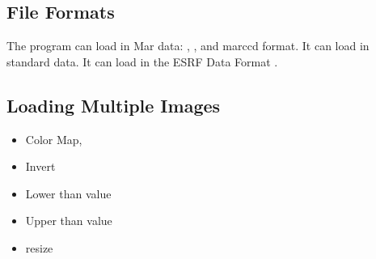 \subsection{File Formats}

The program can load in Mar data: , 
, and  marccd format.
It can load in standard  data. 
It can load in the ESRF Data Format 
.


\subsection{Loading Multiple Images}


\begin{itemize}
\item Color Map, 
\item Invert
\item Lower than value 
\item Upper than value
\item resize
\end{itemize}
